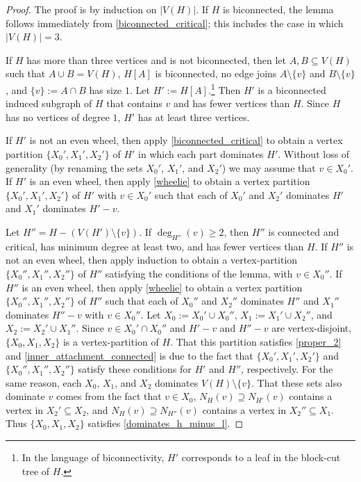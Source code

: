 \documentclass{patmorin}
\begin{document}
\begin{proof}
  The proof is by induction on $|V(H)|$. If $H$ is biconnected, the lemma follows immediately from \cref{biconnected_critical}; this includes the case in which $|V(H)|=3$.

  If $H$ has more than three vertices and is not biconnected, then let $A,B\subseteq V(H)$ such that $A\cup B=V(H)$, $H[A]$ is biconnected, no edge joins $A\setminus\{v\}$ and $B\setminus\{v\}$, and $\{v\}:=A\cap B$ has size $1$.  Let $H':=H[A]$.\footnote{In the language of biconnectivity, $H'$ corresponds to a leaf in the block-cut tree of $H$.}  Then $H'$ is a biconnected induced subgraph of $H$ that contains $v$ and has fewer vertices than $H$. Since $H$ has no vertices of degree $1$, $H'$ has at least three vertices.  

  If $H'$ is not an even wheel, then apply \cref{biconnected_critical} to obtain a vertex partition $\{X_0',X_1',X_2'\}$ of $H'$ in which each part dominates $H'$.  Without loss of generality (by renaming the sets $X_0'$, $X_1'$, and $X_2'$) we may assume that $v\in X_0'$.  If $H'$ is an even wheel, then apply \cref{wheelie} to obtain a vertex partition $\{X_0',X_1',X_2'\}$ of $H'$ with $v\in X_0'$ such that each of $X_0'$ and $X_2'$ dominates $H'$ and $X_1'$ dominates $H'-v$.
  
  Let $H''=H-(V(H')\setminus\{v\})$. If $\deg_{H''}(v)\ge2$, then $H''$ is connected and critical, has minimum degree at least two, and has fewer vertices than $H$.  If $H''$ is not an even wheel, then apply induction to obtain a vertex-partition $\{X_0'',X_1'',X_2''\}$ of $H''$ satisfying the conditions of the lemma, with $v\in X_0''$.  If $H''$ is an even wheel, then apply \cref{wheelie} to obtain a vertex partition $\{X_0'',X_1'',X_2''\}$ of $H''$ such that each of $X_0''$ and $X_2''$ dominates $H''$ and $X_1''$ dominates $H''-v$ with $v\in X_0''$.  Let $X_0:=X_0'\cup X_0''$, $X_1:=X_1'\cup X_2''$, and $X_2:=X_2'\cup X_1''$.  Since $v\in X_0'\cap X_0''$ and $H'-v$ and $H''-v$ are vertex-disjoint, $\{X_0,X_1,X_2\}$ is a vertex-partition of $H$. That this partition satisfies \ref{proper_2} and \ref{inner_attachment_connected} is due to the fact that $\{X_0',X_1',X_2'\}$ and $\{X_0'',X_1'',X_2''\}$ satisfy these conditions for $H'$ and $H''$, respectively. For the same reason, each $X_0$, $X_1$, and $X_2$ dominates $V(H)\setminus\{v\}$.  That these sets also dominate $v$ comes from the fact that $v\in X_0$, $N_H(v)\supseteq N_{H'}(v)$ contains a vertex in $X_2'\subseteq X_2$, and $N_H(v)\supseteq N_{H''}(v)$ contains a vertex in $X_2''\subseteq X_1$.  Thus $\{X_0,X_1,X_2\}$ satisfies \ref{dominates_h_minus_l}.
  

\end{proof}
\end{document}
